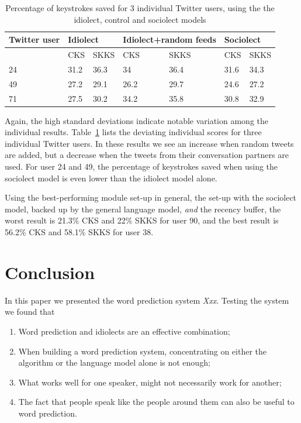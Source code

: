 \documentclass[11pt]{article}
\begin{document}
{\begin{table}[htb] 
\centering
\begin{tabular}{l|llllll} 
Twitter user&\multicolumn{2}{l}{Idiolect}&\multicolumn{2}{l}{Idiolect+random feeds}&\multicolumn{2}{l}{Sociolect}\\
\hline
&CKS&SKKS&CKS&SKKS&CKS&SKKS\\
24&31.2&36.3&34&36.4&31.6&34.3\\
49&27.2&29.1&26.2&29.7&24.6&27.2\\
71&27.5&30.2&34.2&35.8&30.8&32.9\\
\end{tabular} 
\caption{Percentage of keystrokes saved for 3 individual Twitter users, using the the idiolect, control and sociolect models}
\label{deviations}
\end{table}

Again, the high standard deviations indicate notable variation among the individual results. Table~\ref{deviations} lists the deviating individual scores for three individual Twitter users. In these results we see an increase when random tweets are added, but a decrease when the tweets from their conversation partners are used. For user 24 and 49, the percentage of keystrokes saved when using the sociolect model is even lower than the idiolect model alone.  

Using the best-performing module set-up in general, the set-up with the sociolect model, backed up by the general language model, \emph{and} the recency buffer, the worst result is 21.3\% CKS and 22\% SKKS for user 90, and the best result is 56.2\% CKS and 58.1\% SKKS for user 38.


\section{Conclusion} \label{conclusion}

In this paper we presented the word prediction system \emph{Xxx}. Testing the system we found that

\begin{enumerate}
\item Word prediction and idiolects are an effective combination;
\item When building a word prediction system, concentrating on either the algorithm or the language model alone is not enough;
\item What works well for one speaker, might not necessarily work for another;
\item The fact that people speak like the people around them can also be useful to word prediction.
\end{enumerate}

}
\end{document}
